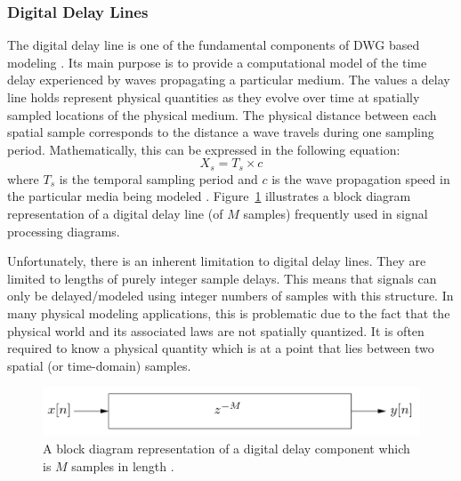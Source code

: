 \documentclass[main.tex]{subfiles}
\begin{document}
\subsubsection{Digital Delay Lines}
The digital delay line is one of the fundamental components of DWG based modeling . Its main purpose is to provide a computational model of the time delay experienced by waves propagating a particular medium. The values a delay line holds represent physical quantities as they evolve over time at spatially sampled locations of the physical medium. The physical distance between each spatial sample corresponds to the distance a wave travels during one sampling period. Mathematically, this can be expressed in the following equation:
\begin{equation}
    X_s = T_s \times c
\end{equation}
where $T_s$ is the temporal sampling period and $c$ is the wave propagation speed in the particular media being modeled . Figure~\ref{fig:digitalDelayLine} illustrates a block diagram representation of a digital delay line (of $M$ samples) frequently used in signal processing diagrams.

Unfortunately, there is an inherent limitation to digital delay lines. They are limited to lengths of purely integer sample delays. This means that signals can only be delayed/modeled using integer numbers of samples with this structure. In many physical modeling applications, this is problematic due to the fact that the physical world and its associated laws are not spatially quantized. It is often required to know a physical quantity which is at a point that lies between two spatial (or time-domain) samples.

\begin{figure}[h]
    \centering
    \includegraphics[scale=.35]{./images/diagrams/digitalDelayLine.png}
    \caption{A block diagram representation of a digital delay component which is $M$ samples in length .}
    \label{fig:digitalDelayLine}
\end{figure}
\end{document}
